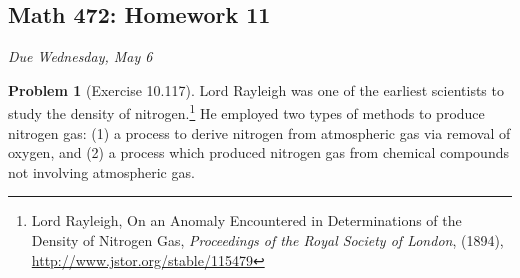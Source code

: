 \documentclass[10pt]{article}
\theoremstyle{definition}
\newtheorem{problem}[theorem]{Problem}
\newcommand{\1}[1]{\textbf{1}_{\left[#1\right]}} %
\begin{document}
\begin{center}
  \section*{Math 472: Homework 11}
  \textit{Due Wednesday, May 6}
\end{center}

\begin{problem}[Exercise 10.117]
  Lord Rayleigh was one of the earliest scientists to study the density of
  nitrogen.\footnote{Lord Rayleigh, On an Anomaly Encountered in
    Determinations of the Density of Nitrogen Gas, \textit{Proceedings of the
      Royal Society of London}, (1894),
    \url{http://www.jstor.org/stable/115479}} He employed two types of methods
  to produce nitrogen gas: (1) a process to derive nitrogen from atmospheric
  gas via removal of oxygen, and (2) a process which produced nitrogen gas
  from chemical compounds not involving atmospheric gas.


\end{problem}
\end{document}
